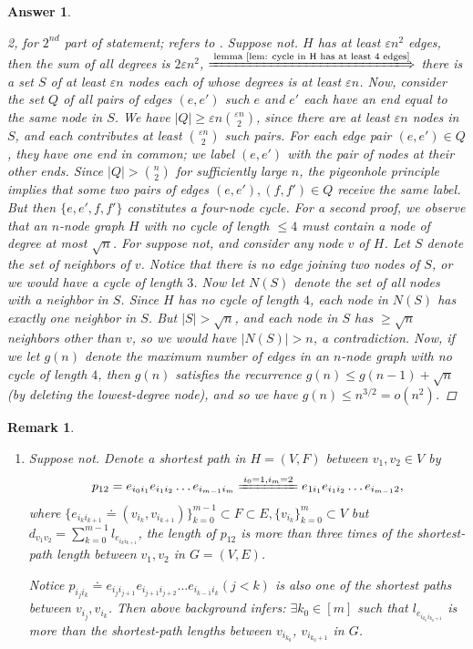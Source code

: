 \documentclass[11pt]{article}
\theoremstyle{numberplain}
\theoremstyle{nonumberplain}
\newtheorem{proof}{Proof}
\newtheorem{rem}{Remark}
\newtheorem{ans}{Answer}
\newcommand{\dps}{\displaystyle}
\def\ve{{\varepsilon}}
\newcommand{\0}{{\mathbf{0}}}
\begin{document}
\begin{ans}
\begin{enumerate}
\begin{proof}[2, for $2^{nd}$ part of statement; refers to \cite{solcornell}]
Suppose not. $H$ has at least $\ve n^2$ edges, then the sum of all degrees is $2 \ve n^2$, $\xLongrightarrow{\text{lemma \ref{lem: cycle in H has at least 4 edges}}}$ there is a set $S$ of at least $\ve n$ nodes each of whose degrees is at least $\ve n$.
Now, consider the set $Q$ of all pairs of edges $(e,e')$ such $e$ and $e'$ each have an end equal to the same node in $S$. We have $|Q| \geq \ve n {{\ve n} \choose 2}$, since there are at least $\ve n$ nodes in $S$, and each contributes at least ${{\ve n} \choose 2}$ such pairs. For each edge pair $(e,e') \in Q$, they have one end in common;
we {\em label} $(e,e')$ with the pair of nodes at their other ends.
Since $|Q| > {n \choose 2}$ for sufficiently large $n$, the pigeonhole principle implies that some two pairs of edges $(e,e'), (f,f') \in Q$ receive the same label. But then $\{e, e', f, f'\}$ constitutes a four-node cycle. For a second proof, we observe that an $n$-node graph $H$ with no cycle of length $\leq 4$ must contain a node of degree at most $\sqrt{n}$. For suppose not, and consider any node $v$ of $H$. Let $S$ denote the set of neighbors of $v$. Notice that there is no edge joining two nodes of $S$, or we would have a cycle of length $3$. Now let $N(S)$ denote the set of all nodes with a neighbor in $S$. Since $H$ has no cycle of length $4$, each node in $N(S)$ has exactly one neighbor in $S$. But $|S| > \sqrt{n}$, and each node in $S$ has $\geq \sqrt{n}$ neighbors other than $v$, so we would have $|N(S)| > n$, a contradiction. Now, if we let $g(n)$ denote the maximum number of edges in an $n$-node graph with no cycle of length $4$, then $g(n)$ satisfies the recurrence $g(n) \leq g(n-1) + \sqrt{n}$ (by deleting the lowest-degree node), and so we have $g(n) \leq n^{3/2} = o(n^2)$.
\end{proof} 
\end{enumerate}
\end{ans}
\begin{rem}
\begin{enumerate}
\item Suppose not. Denote a shortest path in $H=(V,F)$ between $v_1, v_2\in V$ by
$$p_{12}=e_{i_0i_1}e_{i_1 i_2}\ldots e_{i_{m-1} i_m}\xlongequal{i_0=1,i_m=2}e_{1i_1}e_{i_1 i_2}\ldots e_{i_{m-1} 2},
$$
where $\{e_{i_ki_{k+1}}\doteq (v_{i_k}, v_{i_{k+1}}) \}_{k=0}^{m-1}\subset F\subset E,\{v_{i_k} \}_{k=0}^m\subset
 V$ but $\dps d_{v_1v_2}=\sum_{k=0}^{m-1}l_{e_{i_k i_{k+1}}}$, the length of $p_{12}$ is more than three times of the shortest-path length between $v_1,v_2$  in $G=(V,E)$.\par
Notice $p_{i_j i_k}\doteq e_{i_ji_{j+1}}e_{i_{j+1} i_{j+2}}\ldots e_{i_{k-1} i_k} (j<k)$ is also one of the  shortest paths between $v_{i_j},v_{i_k}$. Then above background infers: $\exists k_0\in [m]$ such that 
$l_{e_{i_{k_0} i_{k_0+1}}}$ is more than the shortest-path lengths between $v_{i_{k_0}}$, $v_{i_{k_0+1}}$ in $G$.
\end{enumerate}
\end{rem}
\end{document}
